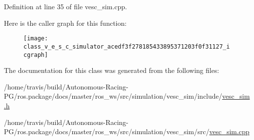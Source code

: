 Definition at line 35 of file vesc\+\_\+sim.\+cpp.



Here is the caller graph for this function\+:
\nopagebreak
\begin{figure}[H]
\begin{center}
\leavevmode
\texttt{[image: class\_v\_e\_s\_c\_simulator\_acedf3f278185433895371203f0f31127\_icgraph]}
\end{center}
\end{figure}




The documentation for this class was generated from the following files\+:\begin{DoxyCompactItemize}
\item 
/home/travis/build/\+Autonomous-\/\+Racing-\/\+P\+G/ros.\+package/docs/master/ros\+\_\+ws/src/simulation/vesc\+\_\+sim/include/\hyperlink{vesc__sim_8h}{vesc\+\_\+sim.\+h}\item 
/home/travis/build/\+Autonomous-\/\+Racing-\/\+P\+G/ros.\+package/docs/master/ros\+\_\+ws/src/simulation/vesc\+\_\+sim/src/\hyperlink{vesc__sim_8cpp}{vesc\+\_\+sim.\+cpp}\end{DoxyCompactItemize}
